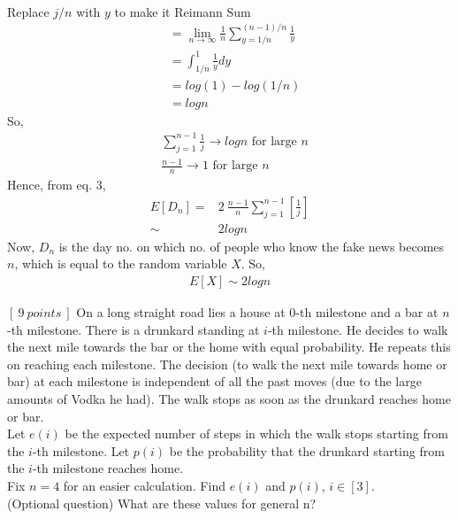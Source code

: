 \documentclass[12pt]{article}
\begin{document}
\begin{solution}
\begin{align*}
        \end{align*}
        Replace $j/n$ with $y$ to make it Reimann Sum\\
        \begin{align*}
        &=\lim_{n \to \infty}\frac{1}{n}\sum_{y=1/n}^{(n-1)/n}\frac{1}{y}\\
        &=\int_{1/n}^{1} \frac{1}{y}dy\\
        &=log(1)-log(1/n)\\
        &=log n
        \end{align*}
    So,
    \begin{align*}
        &\sum_{j=1}^{n-1}\frac{1}{j} \to log n \text{ for large } n\\
        &\frac{n-1}{n} \to 1 \text{ for large } n
    \end{align*}
    Hence, from eq. 3,
    \begin{align*}
        E[D_n]=&2\: \frac{n-1}{n}\sum_{j=1}^{n-1}[\frac{1}{j}]\\
        \sim\: &2 log n
    \end{align*}
    Now, $D_n$ is the day no. on which no. of people who know the fake news becomes $n$, which is equal to the random variable $X$.
    So,\begin{align*}
        E[X] \sim 2 log n
    \end{align*} 
  \end{solution}
  \begin{question}
    $[\:9\:points\:]$ On a long straight road lies a house at 0-th
    milestone and a bar at $n$-th milestone. There is a drunkard standing
    at $i$-th milestone. He decides to walk the next mile towards the bar
    or the home with equal probability. He repeats this on reaching each
    milestone. The decision (to walk the next mile towards home or bar)
    at each milestone is independent of all the past moves (due to the large
    amounts of Vodka he had). The walk stops as soon as the drunkard
    reaches home or bar.\vspace{5pt}\\
    Let $e(i)$ be the expected number of steps in which the walk stops
    starting from the $i$-th milestone. Let $p(i)$ be the probability that the
    drunkard starting from the $i$-th milestone reaches home.\vspace{5pt}\\
    Fix $n = 4$ for an easier calculation. Find $e(i)$ and $p(i)$, \:$i \in [3]$.\vspace{5pt}\\
    (Optional question) What are these values for general n?
  \end{question}
  
\end{document}
